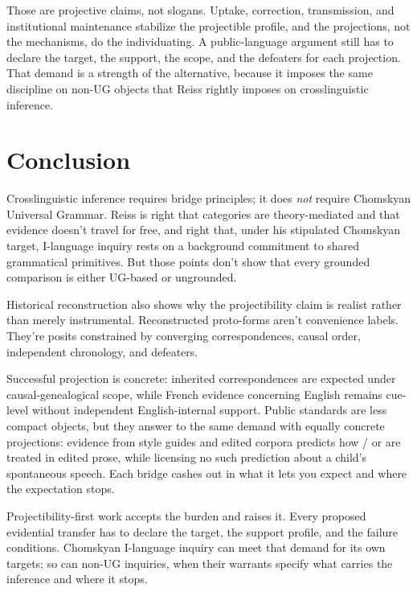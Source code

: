 \documentclass[12pt]{article}
\begin{document}
Those are projective claims, not slogans. Uptake, correction, transmission, and institutional maintenance stabilize the projectible profile, and the projections, not the mechanisms, do the individuating. A public-language argument still has to declare the target, the support, the scope, and the defeaters for each projection. That demand is a strength of the alternative, because it imposes the same discipline on non-UG objects that Reiss rightly imposes on crosslinguistic inference.

\section{Conclusion}

Crosslinguistic inference requires bridge principles; it does \emph{not} require Chomskyan Universal Grammar. Reiss is right that categories are theory-mediated and that evidence doesn't travel for free, and right that, under his stipulated Chomskyan target, I-language inquiry rests on a background commitment to shared grammatical primitives. But those points don't show that every grounded comparison is either UG-based or ungrounded.

Historical reconstruction also shows why the projectibility claim is realist rather than merely instrumental. Reconstructed proto-forms aren't convenience labels. They're posits constrained by converging correspondences, causal order, independent chronology, and defeaters.

Successful projection is concrete: inherited correspondences are expected under causal-genealogical scope, while French evidence concerning English  remains cue-level without independent English-internal support. Public standards are less compact objects, but they answer to the same demand with equally concrete projections: evidence from style guides and edited corpora predicts how / or  are treated in edited prose, while licensing no such prediction about a child's spontaneous speech. Each bridge cashes out in what it lets you expect and where the expectation stops.

Projectibility-first work accepts the burden and raises it. Every proposed evidential transfer has to declare the target, the support profile, and the failure conditions. Chomskyan I-language inquiry can meet that demand for its own targets; so can non-UG inquiries, when their warrants specify what carries the inference and where it stops.
\end{document}
